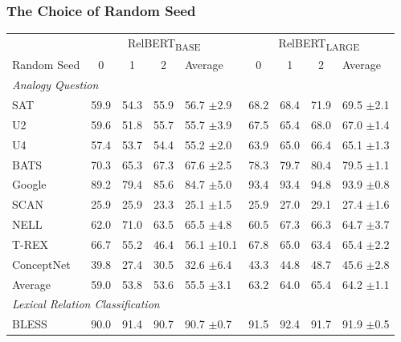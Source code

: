 \documentclass[3p]{elsarticle}
\begin{document}
{\subsubsection{The Choice of Random Seed}\label{sec:relbert:the-choice-of-random-seed}


\begin{table}[!t]
\centering
\begin{tabular}{lccclcccl}
\toprule
      & \multicolumn{4}{c}{RelBERT\textsubscript{BASE}} & \multicolumn{4}{c}{RelBERT\textsubscript{LARGE}} \\
      \cmidrule(l){2-5}\cmidrule(l){6-9}
Random Seed& 0       & 1       & 2       & Average           & 0        & 1        & 2       & Average          \\\midrule
\multicolumn{9}{l}{\textit{Analogy Question}} \\ 
SAT        & 59.9    & 54.3    & 55.9    & 56.7 $\pm$2.9     & 68.2     & 68.4     & 71.9    & 69.5 $\pm$2.1    \\
U2         & 59.6    & 51.8    & 55.7    & 55.7 $\pm$3.9     & 67.5     & 65.4     & 68.0    & 67.0 $\pm$1.4    \\
U4         & 57.4    & 53.7    & 54.4    & 55.2 $\pm$2.0     & 63.9     & 65.0     & 66.4    & 65.1 $\pm$1.3    \\
BATS       & 70.3    & 65.3    & 67.3    & 67.6 $\pm$2.5     & 78.3     & 79.7     & 80.4    & 79.5 $\pm$1.1    \\
Google     & 89.2    & 79.4    & 85.6    & 84.7 $\pm$5.0     & 93.4     & 93.4     & 94.8    & 93.9 $\pm$0.8    \\
SCAN       & 25.9    & 25.9    & 23.3    & 25.1 $\pm$1.5     & 25.9     & 27.0     & 29.1    & 27.4 $\pm$1.6    \\
NELL       & 62.0    & 71.0    & 63.5    & 65.5 $\pm$4.8     & 60.5     & 67.3     & 66.3    & 64.7 $\pm$3.7    \\
T-REX      & 66.7    & 55.2    & 46.4    & 56.1 $\pm$10.1    & 67.8     & 65.0     & 63.4    & 65.4 $\pm$2.2    \\
ConceptNet & 39.8    & 27.4    & 30.5    & 32.6 $\pm$6.4     & 43.3     & 44.8     & 48.7    & 45.6 $\pm$2.8    \\\midrule
Average    & 59.0    & 53.8    & 53.6    & 55.5 $\pm$3.1     & 63.2     & 64.0     & 65.4    & 64.2 $\pm$1.1    \\\midrule
\multicolumn{9}{l}{\textit{Lexical Relation Classification}} \\ 
BLESS      & 90.0    & 91.4    & 90.7    & 90.7 $\pm$0.7     & 91.5     & 92.4     & 91.7    & 91.9 $\pm$0.5    \\

\end{tabular}
\end{table}}
\end{document}
